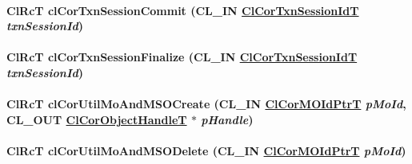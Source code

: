 \hypertarget{group__group13_ga67}{
\paragraph[clCorTxnSessionCommit]{\setlength{\rightskip}{0pt plus 5cm}Cl\-Rc\-T cl\-Cor\-Txn\-Session\-Commit (CL\_\-IN \hyperlink{group__group13_ga16}{Cl\-Cor\-Txn\-Session\-Id\-T} {\em txn\-Session\-Id})}\hfill}
\label{group__group13_ga67}


\hypertarget{group__group13_ga69}{
\paragraph[clCorTxnSessionFinalize]{\setlength{\rightskip}{0pt plus 5cm}Cl\-Rc\-T cl\-Cor\-Txn\-Session\-Finalize (CL\_\-IN \hyperlink{group__group13_ga16}{Cl\-Cor\-Txn\-Session\-Id\-T} {\em txn\-Session\-Id})}\hfill}
\label{group__group13_ga69}


\hypertarget{group__group13_ga143}{
\paragraph[clCorUtilMoAndMSOCreate]{\setlength{\rightskip}{0pt plus 5cm}Cl\-Rc\-T cl\-Cor\-Util\-Mo\-And\-MSOCreate (CL\_\-IN \hyperlink{struct_cl_cor_m_o_id}{Cl\-Cor\-MOId\-Ptr\-T} {\em p\-Mo\-Id}, CL\_\-OUT \hyperlink{struct_cl_cor_object_handle}{Cl\-Cor\-Object\-Handle\-T} $\ast$ {\em p\-Handle})}\hfill}
\label{group__group13_ga143}


\hypertarget{group__group13_ga144}{
\paragraph[clCorUtilMoAndMSODelete]{\setlength{\rightskip}{0pt plus 5cm}Cl\-Rc\-T cl\-Cor\-Util\-Mo\-And\-MSODelete (CL\_\-IN \hyperlink{struct_cl_cor_m_o_id}{Cl\-Cor\-MOId\-Ptr\-T} {\em p\-Mo\-Id})}\hfill}
\label{group__group13_ga144}


